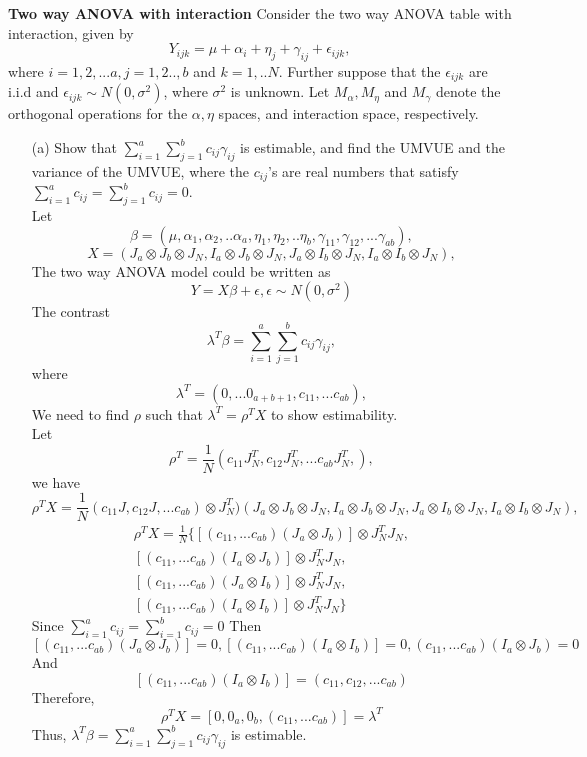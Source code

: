 \documentclass{homework}
\begin{document}
\exercise
\textbf{Two way ANOVA with interaction} Consider the two way ANOVA table with interaction, given by
   \[ 
   Y_{ijk}  = \mu + \alpha_i + \eta_j + \gamma_{ij} + \epsilon_{ijk},
    \] 
 where $i=1,2,...a, j=1,2.., b$ and $k=1,..N$. Further suppose that the $\epsilon_{ijk}$ are i.i.d and $\epsilon_{ijk} \sim N(0, \sigma^2)$, where $\sigma^2$ is unknown. Let $M_{\alpha}, M_{\eta}$ and $M_{\gamma}$ denote the orthogonal operations for the $\alpha, \eta$ spaces, and interaction space, respectively.  
\begin{itemize}
    \item [(a)] Show that $\sum_{i=1}^{a}\sum_{j=1}^{b} c_{ij}\gamma_{ij}$ is estimable, and find the UMVUE and the variance of the UMVUE, where the $c_{ij}$'s are real numbers that satisfy $\sum_{i=1}^{a} c_{ij}= \sum_{j=1}^{b} c_{ij}= 0$.\\
    Let 
   \[ 
   \beta = (\mu, \alpha_1, \alpha_2,.. \alpha_a, \eta_1, \eta_2,.. \eta_b, \gamma_{11}, \gamma_{12},... \gamma_{ab}),
    \]     
   \[ 
   X = (J_a \otimes J_b \otimes J_N, I_a \otimes J_b \otimes J_N, J_a \otimes I_b \otimes J_N, I_a \otimes I_b\otimes J_N),
    \]  
    The two way ANOVA model could be written as 
    \[ 
   Y = X\beta + \epsilon, \epsilon \sim N(0, \sigma^2)
    \]   
    The contrast 
       \[ 
    \lambda^T \beta = \sum_{i=1}^a \sum_{j=1}^b c_{ij}\gamma_{ij},
    \]
    where 
    \[ 
    \lambda^T = (0, ... 0_{a+b+1}, c_{11}, ...c_{ab}),
    \]
    We need to find $\rho$ such that $\lambda^T = \rho^T X$ to show estimability.\\
    Let 
     \[ 
    \rho^T = \frac{1}{N} (c_{11}J_N^T,c_{12}J_N^T, ... c_{ab}J_N^T,),
    \]  
    we have
    \[ 
    \rho^T X = \frac{1}{N} (c_{11}J,c_{12}J, ... c_{ab})\otimes J_N^T) (J_a \otimes J_b \otimes J_N, I_a \otimes J_b \otimes J_N, J_a \otimes I_b \otimes J_N, I_a \otimes I_b\otimes J_N),
    \]   
    \begin{equation}
    \begin{split}
    \rho^T X = \frac{1}{N} \{ [(c_{11}, ... c_{ab})(J_a \otimes J_b)]\otimes J_N^TJ_N, \\
    [(c_{11}, ... c_{ab})(I_a \otimes J_b)]\otimes J_N^TJ_N, \\
    [(c_{11}, ... c_{ab})(J_a \otimes I_b)]\otimes J_N^TJ_N, \\
    [(c_{11}, ... c_{ab})(I_a \otimes I_b)]\otimes J_N^TJ_N \}
    \end{split}
    \end{equation}
Since $\sum_{i=1}^{a} c_{ij} = \sum_{i=1}^{b} c_{ij} = 0$ Then\\
    \[ 
    [(c_{11}, ... c_{ab})(J_a \otimes J_b)]= 0, [(c_{11}, ... c_{ab})(I_a \otimes I_b)] = 0, (c_{11}, ... c_{ab})(I_a \otimes J_b) = 0
    \] 
    And
    \[ 
    [(c_{11}, ... c_{ab})(I_a \otimes I_b)] = (c_{11}, c_{12},... c_{ab})
    \] 
    Therefore, 
    \[ 
    \rho^T X = [0, 0_a, 0_b, (c_{11}, ... c_{ab})] = \lambda^T
    \]
    Thus, $\lambda^T \beta = \sum_{i=1}^{a} \sum_{j=1}^{b} c_{ij}\gamma_{ij}$ is estimable.\\
    

\end{itemize}
\end{document}
